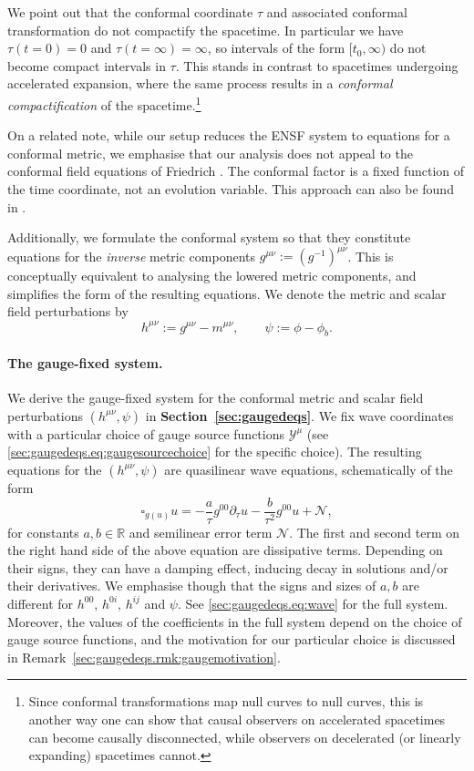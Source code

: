\documentclass{article}
\newcommand{\RR}{\mathbb{R}}
\newcommand{\mc}{\mathcal}
\newcommand{\pa}{\partial}
\begin{document}
\begin{remark}
    We point out that the conformal coordinate $\tau$ and associated conformal transformation do not compactify the spacetime. In particular we have $\tau(t=0) = 0$ and $\tau(t=\infty) = \infty$, so intervals of the form $[t_0,\infty)$ do not become compact intervals in $\tau$. This stands in contrast to spacetimes undergoing accelerated expansion, where the same process results in a \emph{conformal compactification} of the spacetime.\footnote{Since conformal transformations map null curves to null curves, this is another way one can show that causal observers on accelerated spacetimes can become causally disconnected, while observers on decelerated (or linearly expanding) spacetimes cannot.} 
    
    On a related note, while our setup reduces the ENSF system to equations for a conformal metric, we emphasise that our analysis does not appeal to the conformal field equations of Friedrich \cite{Fri:deSitterstab:86}. The conformal factor is a fixed function of the time coordinate, not an evolution variable. This approach can also be found in \cite{Oli:EulerdeSitterstab:16}.
\end{remark}
Additionally, we formulate the conformal system so that they constitute equations for the \emph{inverse} metric components $g^{\mu\nu}:=(g^{-1})^{\mu\nu}$. This is conceptually equivalent to analysing the lowered metric components, and simplifies the form of the resulting equations. We denote the metric and scalar field perturbations by 
\begin{equation}
    h^{\mu\nu} := g^{\mu\nu} - m^{\mu\nu},\qquad\psi := \phi - \phi_b.
\end{equation}

\paragraph{The gauge-fixed system.}
We derive the gauge-fixed system for the conformal metric and scalar field perturbations $(h^{\mu\nu},\psi)$ in \textbf{Section~\ref{sec:gaugedeqs}}. We fix wave coordinates with a particular choice of gauge source functions $\mc{Y}^\mu$ (see \eqref{sec:gaugedeqs.eq:gaugesourcechoice} for the specific choice). The resulting equations for the $(h^{\mu\nu},\psi)$ are quasilinear wave equations, schematically of the form
\begin{equation}\label{sec:intro.eq:waveeqschem}
    \square_{g(u)} u = -\frac{a}{\tau}g^{00}\pa_\tau u - \frac{b}{\tau^2}g^{00}u + \mc{N},
\end{equation}
for constants $a,b \in \RR$ and semilinear error term $\mc{N}$. The first and second term on the right hand side of the above equation are dissipative terms. Depending on their signs, they can have a damping effect, inducing decay in solutions and/or their derivatives. We emphasise though that the signs and sizes of $a,b$ are different for $h^{00}$, $h^{0i}$, $h^{ij}$ and $\psi$. See \eqref{sec:gaugedeqs.eq:wave} for the full system. Moreover, the values of the coefficients in the full system depend on the choice of gauge source functions, and the motivation for our particular choice is discussed in Remark~\ref{sec:gaugedeqs.rmk:gaugemotivation}.
\end{document}
